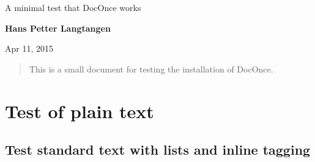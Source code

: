 \documentclass[%
twoside,                 %
final,                   %
10pt]{article}
\begin{document}








\thispagestyle{empty}

\begin{center}
{\LARGE\bf
\begin{spacing}{1.25}
A minimal test that DocOnce works
\end{spacing}
}
\end{center}


\begin{center}
{\bf Hans Petter Langtangen${}^{}$} \\ [0mm]
\end{center}

    \begin{center}
\end{center}
    

\begin{center} %
Apr 11, 2015
\end{center}

\vspace{1cm}

\begin{abstract}
This is a small document for testing the installation of DocOnce.

\end{abstract}

\tableofcontents


\vspace{1cm} %




\section{Test of plain text}

\subsection{Test standard text with lists and inline tagging}
\end{document}
